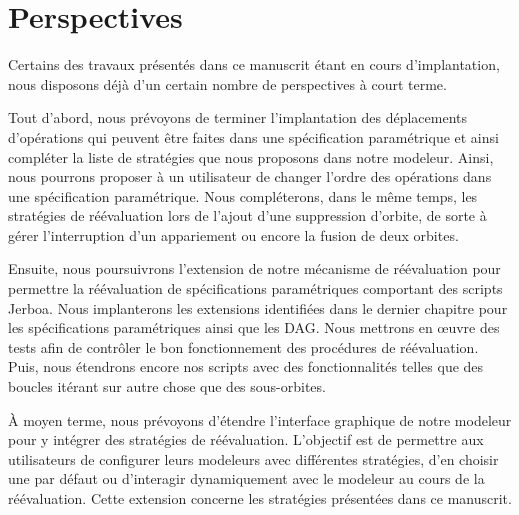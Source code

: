 \section*{Perspectives}
\renewcommand\sectionname{Perspectives}
\markboth{Conclusion}{\sectionname}


Certains des travaux présentés dans ce manuscrit étant en cours d'implantation,
nous disposons déjà d'un certain nombre de perspectives à court terme. %

Tout d'abord, nous prévoyons de terminer l'implantation des déplacements
d'opérations qui peuvent être faites dans une spécification paramétrique et
ainsi compléter la liste de stratégies que nous proposons dans notre modeleur. %
Ainsi, nous pourrons proposer à un utilisateur de changer l'ordre des opérations
dans une spécification
paramétrique. %
Nous compléterons, dans le même temps, les stratégies de réévaluation lors de
l'ajout d'une suppression d'orbite, de sorte à gérer l'interruption d'un
appariement ou encore la fusion de deux orbites. %

Ensuite, nous poursuivrons l'extension de notre mécanisme de réévaluation pour
permettre la réévaluation de spécifications paramétriques comportant des scripts
Jerboa. %
Nous implanterons les extensions identifiées dans le dernier chapitre pour les
spécifications paramétriques ainsi que les DAG. %
Nous mettrons en \oe uvre des tests afin de contrôler le bon fonctionnement des
procédures de réévaluation. %
Puis, nous étendrons encore nos scripts avec des fonctionnalités telles que des
boucles itérant sur autre chose que des sous-orbites. %

À moyen terme, nous prévoyons d'étendre l'interface graphique de notre modeleur
pour y intégrer des stratégies de réévaluation. %
L'objectif est de permettre aux utilisateurs de configurer leurs modeleurs avec
différentes stratégies, d'en choisir une par défaut ou d'interagir dynamiquement
avec le modeleur au cours de la réévaluation. %
Cette extension concerne les stratégies présentées dans ce manuscrit. %

